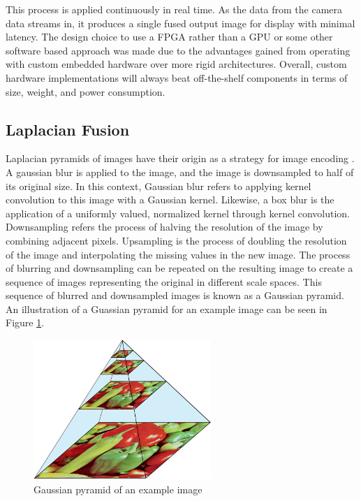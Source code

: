 \documentclass[sigconf]{acmart/acmart}
\begin{document}
This process is applied continuously in real time. As the data from the camera data streams in, it produces a single fused output image for display with minimal latency. The design choice to use a FPGA rather than a GPU or some other software based approach was made due to the advantages gained from operating with custom embedded hardware over more rigid architectures. Overall, custom hardware implementations will always beat off-the-shelf components in terms of size, weight, and power consumption.

\subsection{Laplacian Fusion}

Laplacian pyramids of images have their origin as a strategy for image encoding \cite{burt_laplacian_1983}. A gaussian blur is applied to the image, and the image is downsampled to half of its original size. In this context, Gaussian blur refers to applying kernel convolution to this image with a Gaussian kernel. Likewise, a box blur is the application of a uniformly valued, normalized kernel through kernel convolution. Downsampling refers the process of halving the resolution of the image by combining adjacent pixels. Upsampling is the process of doubling the resolution of the image and interpolating the missing values in the new image. The process of blurring and downsampling can be repeated on the resulting image to create a sequence of images representing the original in different scale spaces. This sequence of blurred and downsampled images is known as a Gaussian pyramid. An illustration of a Guassian pyramid for an example image can be seen in Figure \ref{fig_pepper_gaussian_pyramid}.

\begin{figure}[h]
	\centering
	\includegraphics[width=0.6\textwidth]{figures/peppers/gaussian_pyramid}
	\caption{Gaussian pyramid of an example image}
	\label{fig_pepper_gaussian_pyramid}
\end{figure}
\end{document}
